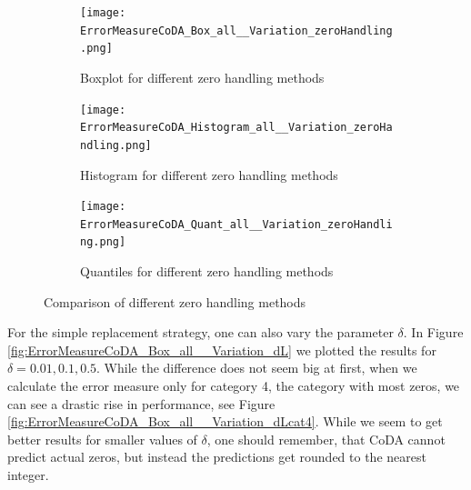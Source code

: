 \begin{figure}[htb!]
\centering
\begin{subfigure}[b]{0.45\textwidth}
\texttt{[image: ErrorMeasureCoDA\_Box\_all\_\_Variation\_zeroHandling.png]}
\caption{Boxplot for different zero handling methods}
\label{fig:Coda zero handling Box}
\end{subfigure}
\hfill
\begin{subfigure}[b]{0.45\textwidth}
\texttt{[image: ErrorMeasureCoDA\_Histogram\_all\_\_Variation\_zeroHandling.png]}
\caption{Histogram for different zero handling methods}
\label{fig:Coda zero handling Hist}
\end{subfigure}
\hfill
\begin{subfigure}[b]{0.8\textwidth}
\texttt{[image: ErrorMeasureCoDA\_Quant\_all\_\_Variation\_zeroHandling.png]}
\caption{Quantiles for different zero handling methods}
\label{fig:Coda zero handling Quant}
\end{subfigure}
\caption{Comparison of different zero handling methods}
\label{fig:Coda zero handling Comp1}
\end{figure}

For the simple replacement strategy, one can also vary the parameter $\delta$. In Figure \ref{fig:ErrorMeasureCoDA_Box_all__Variation_dL} we plotted the results for $\delta=0.01,0.1,0.5$. While the difference does not seem big at first, when we calculate the error measure only for category 4, the category with most zeros, we can see a drastic rise in performance, see Figure \ref{fig:ErrorMeasureCoDA_Box_all__Variation_dLcat4}. While we seem to get better results for smaller values of $\delta$, one should remember, that CoDA cannot predict actual zeros, but instead the predictions get rounded to the nearest integer. 


